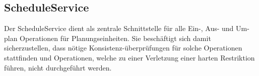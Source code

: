 \subsection{ScheduleService}\label{subsec:ScheduleService}
Der ScheduleService dient als zentrale Schnittstelle für alle Ein-, Aus- und Um-plan Operationen für
Planungseinheiten.
Sie beschäftigt sich damit sicherzustellen, dass nötige Konsistenz-überprüfungen für solche
Operationen stattfinden und Operationen, welche zu einer Verletzung einer harten Restriktion führen,
nicht durchgeführt werden.

